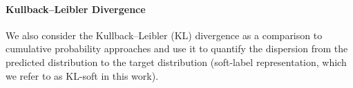 \documentclass{article} %
\begin{document}



\paragraph{Kullback–Leibler Divergence} 
We also consider the Kullback--Leibler (KL) divergence \citep{kullback1951information} as a comparison to cumulative probability approaches and use it to quantify the dispersion from the predicted distribution to the target distribution (soft-label representation, which we refer to as KL-soft in this work).
\end{document}
